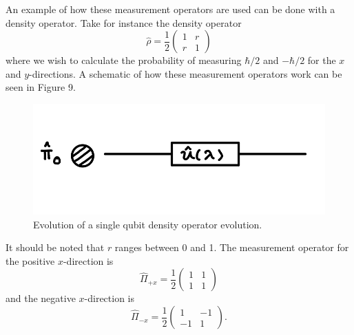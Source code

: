 \documentclass[twocolumn]{article}
\begin{document}
An example of how these measurement operators are used can be done with a density operator. Take for instance the density operator
\begin{equation} \label{eq:39}
\hat{\rho}=\frac{1}{2}
\begin{pmatrix}
1 & r \\
r & 1
\end{pmatrix}
\end{equation}
where we wish to calculate the probability of measuring $\hbar/2$ and $-\hbar/2$ for the $x$ and $y$-directions. A schematic of how these measurement operators work can be seen in Figure 9.
\begin{figure}[h]
\begin{center}
\includegraphics[width=0.90\linewidth]{Density-Operator-Evolution.jpg}
\caption{Evolution of a single qubit density operator evolution.}
\end{center}
\end{figure}
It should be noted that $r$ ranges between 0 and 1. The measurement operator for the positive $x$-direction is
\begin{equation} \label{eq:40}
\hat{\Pi}_{+x}=\frac{1}{2}
\begin{pmatrix}
1 & 1 \\
1 & 1
\end{pmatrix}
\end{equation}
and the negative $x$-direction is
\begin{equation} \label{eq:41}
\hat{\Pi}_{-x}=\frac{1}{2}
\begin{pmatrix}
1 & -1 \\
-1 & 1
\end{pmatrix}.
\end{equation}
\end{document}

